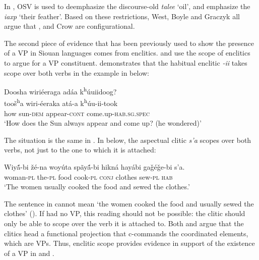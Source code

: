 \documentclass[output=paper]{LSP/langsci}
\begin{document}
In , OSV  is used to deemphasize the discourse-old  \textit{talee} `oil', and emphasize the  \textit{iaxp} `their feather'.  Based on these  restrictions, West, Boyle and Graczyk all argue that ,  and Crow are configurational. 
	
The second piece of evidence that has been previously used to show the presence of a VP in Siouan languages comes from enclitics. \citet{West2003} and \citet{Boyle2007} use the scope of enclitics to argue for a VP constituent. \citet{Boyle2007} demonstrates that the  habitual enclitic \textit{-ii} takes scope over both verbs in the example in  below:


\let\eachwordtwo=\itshape
\begin{exe}
\ex\label{ex:jrs:27} 
\glll Doosha	wiriéeraga 	adáa 	 k\textsuperscript{h}\'uuiidoog?\\
too\v{s}\textsuperscript{h}a 	wiri-éeraka 	atá-a k\textsuperscript{h}\'uu-ii-took \\
how 	sun-\textsc{dem} 	appear-\textsc{cont}  come.up-\textsc{hab.sg.spec} \\
\trans `How does the Sun always appear and come up? (he wondered)' \citep[223]{Boyle2007}
\end{exe}

The situation is the same in .  In  below, the aspectual clitic \textit{s'a} scopes over both verbs, not just to the one to which it is attached:

\begin{exe}
\ex\label{ex:jrs:28} \gll Wiy\'{ã}-bi 		\v{z}é-na 	woy\'uta 	spãy\'{ã}-bi 	hikná 	hayábi 		ga\v{g}é\v{g}e-bi 	s'a. \\
woman-\textsc{pl} the-\textsc{pl} 	food 	cook-\textsc{pl} \textsc{conj} 	clothes 	sew-\textsc{pl} 	\textsc{hab} \\
\trans `The women usually cooked the food and sewed the clothes.' \citep[39]{West2003}
\end{exe}

The sentence in  cannot mean `the women cooked the food and usually sewed the clothes' (\citealt{West2003}).  If  had no VP, this reading should not be possible: the clitic should only be able to scope over the verb it is attached to. Both \citet{Boyle2007} and \citet{West2003} argue that the clitics head a functional projection that c-commands the coordinated elements, which are VPs.  Thus, enclitic scope provides evidence in support of the existence of a VP in  and .
	
\end{document}
